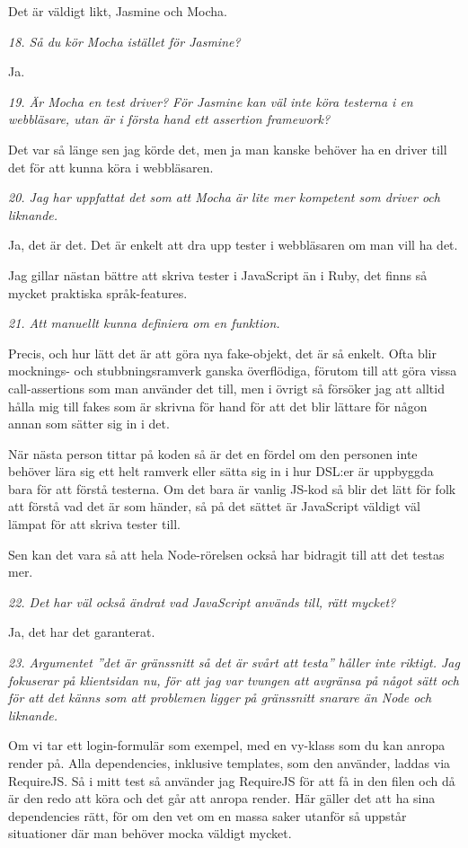 \documentclass[11pt]{article}
\begin{document}
Det är väldigt likt, Jasmine och Mocha.

\emph{18. Så du kör Mocha istället för Jasmine?}

Ja.

\emph{19. Är Mocha en test driver? För Jasmine kan väl inte köra testerna i en webbläsare, utan är i första hand ett assertion framework?}

Det var så länge sen jag körde det, men ja man kanske behöver ha en driver till det för att kunna köra i webbläsaren.

\emph{20. Jag har uppfattat det som att Mocha är lite mer kompetent som driver och liknande.}

Ja, det är det. Det är enkelt att dra upp tester i webbläsaren om man vill ha det.

Jag gillar nästan bättre att skriva tester i JavaScript än i Ruby, det finns så mycket praktiska språk-features.

\emph{21. Att manuellt kunna definiera om en funktion.}

Precis, och hur lätt det är att göra nya fake-objekt, det är så enkelt. Ofta blir mocknings- och stubbningsramverk ganska överflödiga, förutom till att göra vissa call-assertions som man använder det till, men i övrigt så försöker jag att alltid hålla mig till fakes som är skrivna för hand för att det blir lättare för någon annan som sätter sig in i det.

När nästa person tittar på koden så är det en fördel om den personen inte behöver lära sig ett helt ramverk eller sätta sig in i hur DSL:er är uppbyggda bara för att förstå testerna. Om det bara är vanlig JS-kod så blir det lätt för folk att förstå vad det är som händer, så på det sättet är JavaScript väldigt väl lämpat för att skriva tester till.

Sen kan det vara så att hela Node-rörelsen också har bidragit till att det testas mer.

\emph{22. Det har väl också ändrat vad JavaScript används till, rätt mycket?}

Ja, det har det garanterat.

\emph{23. Argumentet ”det är gränssnitt så det är svårt att testa” håller inte riktigt. Jag fokuserar på klientsidan nu, för att jag var tvungen att avgränsa på något sätt och för att det känns som att problemen ligger på gränssnitt snarare än Node och liknande.}

Om vi tar ett login-formulär som exempel, med en vy-klass som du kan anropa render på. Alla dependencies, inklusive templates, som den använder, laddas via RequireJS. Så i mitt test så använder jag RequireJS för att få in den filen och då är den redo att köra och det går att anropa render. Här gäller det att ha sina dependencies rätt, för om den vet om en massa saker utanför så uppstår situationer där man behöver mocka väldigt mycket.
\end{document}
